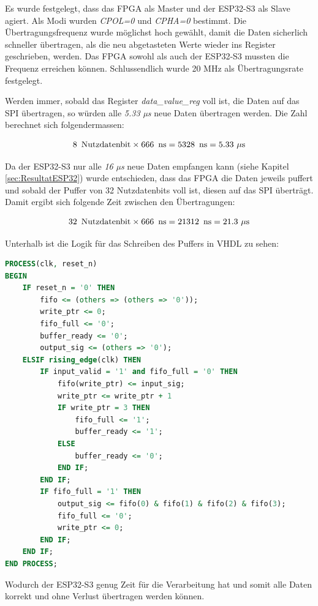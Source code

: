 Es wurde festgelegt, dass das FPGA als Master und der ESP32-S3 als Slave agiert. Als Modi wurden \textit{CPOL=0} und \textit{CPHA=0} bestimmt. Die Übertragungsfrequenz wurde möglichst hoch gewählt, damit die Daten sicherlich schneller übertragen, als die neu abgetasteten Werte wieder ins Register geschrieben, werden.
Das FPGA sowohl als auch der ESP32-S3 mussten die Frequenz erreichen können. Schlussendlich wurde 20 MHz als Übertragungsrate festgelegt.

Werden immer, sobald das Register \textit{data\_value\_reg} voll ist, die Daten auf das SPI übertragen, so würden alle \textit{5.33 µs} neue Daten übertragen werden. Die Zahl berechnet sich folgendermassen:

\begin{equation}
    8 \, \text{ Nutzdatenbit} \times 666 \, \text{ ns} = 5328 \, \text{ ns} = 5.33 \text{ }  \mu\text  s \label{eq:calc_Nutzdatenbit1}
\end{equation}

Da der ESP32-S3 nur alle \textit{16 µs} neue Daten empfangen kann (siehe Kapitel \ref{sec:ResultatESP32}) wurde entschieden, dass das FPGA die Daten jeweils puffert und sobald der Puffer von 32 Nutzdatenbits voll ist, diesen auf das SPI überträgt. Damit ergibt sich folgende Zeit zwischen den Übertragungen:

\begin{equation}
    32 \, \text{ Nutzdatenbit} \times 666 \, \text{ ns} = 21312 \, \text{ ns} = 21.3 \text{ }  \mu\text s \label{eq:calc_Nutzdatenbit2}
\end{equation}

Unterhalb ist die Logik für das Schreiben des Puffers in VHDL zu sehen:
\begin{lstlisting}[language=vhdl]
PROCESS(clk, reset_n)
BEGIN
    IF reset_n = '0' THEN
        fifo <= (others => (others => '0'));
        write_ptr <= 0;
        fifo_full <= '0';
        buffer_ready <= '0';
        output_sig <= (others => '0');
    ELSIF rising_edge(clk) THEN
        IF input_valid = '1' and fifo_full = '0' THEN
            fifo(write_ptr) <= input_sig;
            write_ptr <= write_ptr + 1
            IF write_ptr = 3 THEN
                fifo_full <= '1';
                buffer_ready <= '1';
            ELSE
                buffer_ready <= '0';
            END IF;
        END IF;
        IF fifo_full = '1' THEN
            output_sig <= fifo(0) & fifo(1) & fifo(2) & fifo(3);
            fifo_full <= '0';
            write_ptr <= 0;
        END IF;
    END IF;
END PROCESS;
\end{lstlisting}

Wodurch der ESP32-S3 genug Zeit für die Verarbeitung hat und somit alle Daten korrekt und ohne Verlust übertragen werden können.